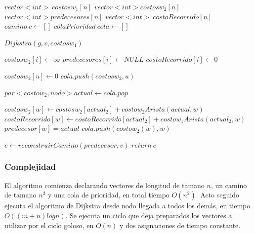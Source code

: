\begin{algorithmic}[1]
\Statex


\State $ vector<int> \: costosw_1[n] $
\State $vector<int> costosw_2[n]$
\State $vector<int> predecesores[n]$
\State $ vector<int> \: costoRecorrido[n] $
\State $camino \: c \gets [] $
\State $colaPrioridad \: cola \gets []$

\Statex

\State $ Dijkstra(g, v, costosw_1) $

\Statex

	\State $ costosw_2[i] \gets \infty $
	\State $ predecesores[i] \gets NULL $
	\State $ costoRecorrido[i] \gets 0 $	
\EndFor

\State $ costosw_2[u] \gets 0 $
\Statex
\State $ cola.push(costosw_2, u) $

	\State $ par<costow_2, nodo> actual \gets cola.pop $
		

			\State $ costosw_2[w] \gets costosw_2[actual_2] + costow_2Arista(actual,w) $
			\State $ costoRecorrido[w] \gets costoRecorrido[actual_2] + costow_1Arista(actual_2,w) $
			\State $ predecesor[w] = actual $
			\State $cola.push(costow_2(w), w)$


			\EndIf

		\EndIf
	\EndFor

\EndWhile

\State $ c \gets reconstruirCamino(predecesor,v) $
\State $ return \:c $

\EndProcedure
\end{algorithmic}


\subsubsection{Complejidad}

El algoritmo comienza declarando vectores de longitud de tamano $n$, un camino de tamano $n^2$ y una cola de prioridad, en total tiempo $O(n^2)$. Acto seguido ejecuta el algoritmo de Dijkstra desde nodo llegada a todos los dem\'as, en tiempo $O((m+n)log n)$. Se ejecuta un ciclo que deja preparados los vectores a utilizar por el ciclo goloso, en $O(n)$ y dos asignaciones de tiempo constante.

